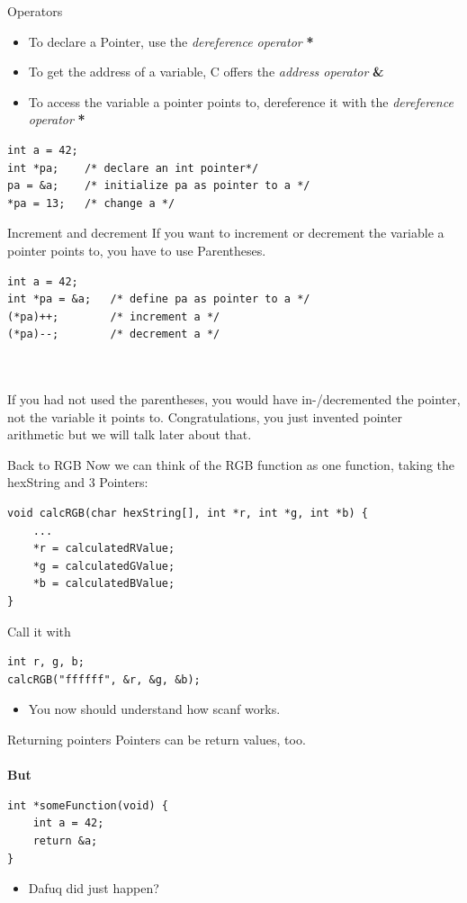 \begin{frame}[fragile]{Operators}
	\begin{itemize}
		\item To declare a Pointer, use the \textit{dereference operator} \textbf{*}
		\item To get the address of a variable, C offers the \textit{address operator} \textbf{\&}
		\item To access the variable a pointer points to, dereference it with the \textit{dereference operator} \textbf{*}
	\end{itemize}
	\begin{lstlisting}[numbers=none]
int a = 42;
int *pa;	/* declare an int pointer*/
pa = &a;	/* initialize pa as pointer to a */
*pa = 13;	/* change a */
\end{lstlisting}
\end{frame}
\begin{frame}[fragile]{Increment and decrement}
	If you want to increment or decrement the variable a pointer points to, you have to use Parentheses.
	\begin{lstlisting}[numbers=none]
int a = 42;
int *pa = &a;	/* define pa as pointer to a */
(*pa)++;		/* increment a */
(*pa)--;		/* decrement a */
\end{lstlisting}
\ \\\ \\
If you had not used the parentheses, you would have in-/decremented the pointer, not the variable it points to. Congratulations, you just invented pointer arithmetic but we will talk later about that.
\end{frame}
\begin{frame}[fragile]{Back to RGB}
	Now we can think of the RGB function as one function, taking the hexString and 3 Pointers:
	\begin{lstlisting}[numbers=none]
void calcRGB(char hexString[], int *r, int *g, int *b) {
	...
	*r = calculatedRValue;
	*g = calculatedGValue;
	*b = calculatedBValue;
}
\end{lstlisting}
	Call it with
	\begin{lstlisting}[numbers=none]
int r, g, b;
calcRGB("ffffff", &r, &g, &b);
\end{lstlisting}
	\begin{itemize}
		\item You now should understand how scanf works.
	\end{itemize}
\end{frame}
\begin{frame}[fragile]{Returning pointers}
Pointers can be return values, too.\\\ \\
\textbf{But} 
	\begin{lstlisting}[numbers=none]
int *someFunction(void) {	
	int a = 42;
	return &a;
}
\end{lstlisting}
	\begin{itemize}
		\item Dafuq did just happen?
	\end{itemize}
\end{frame}

